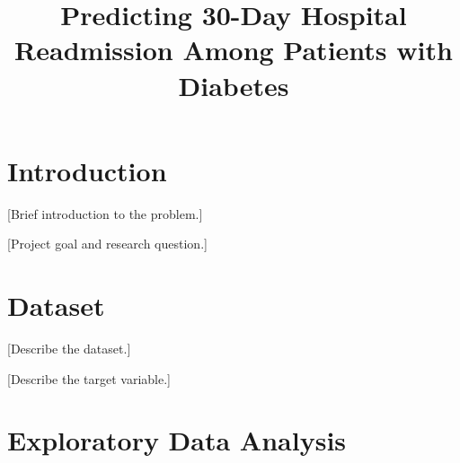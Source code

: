 \documentclass[conference]{IEEEtran}
\begin{document}
\title{Predicting 30-Day Hospital Readmission Among Patients with Diabetes}

\author{
}

\maketitle


\begin{abstract}



\end{abstract}


\section{Introduction}


[Brief introduction to the problem.]

[Project goal and research question.]


\section{Dataset}


[Describe the dataset.]

[Describe the target variable.]


\section{Exploratory Data Analysis}
\end{document}
